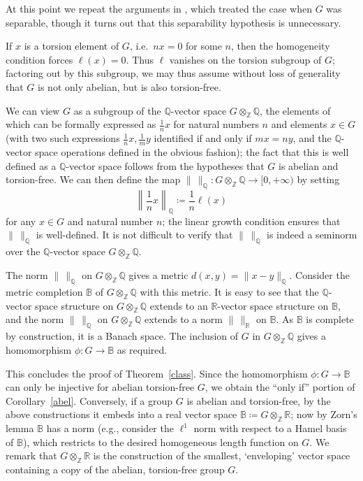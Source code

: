 \documentclass[11pt,a4paper,reqno]{amsart}
\numberwithin{equation}{section}
\theoremstyle{plain}
\theoremstyle{definition}
\newcommand\R{\mathbb{R}}
\newcommand\Z{\mathbb{Z}}
\newcommand\Q{\mathbb{Q}}
\newcommand\normsymb{\ell}  %
\newcommand\norm[1]{\ell({#1})}   %
\begin{document}
At this point we repeat the arguments in \cite[Theorem B]{KR2}, which
treated the case when $G$ was separable, though it turns out that this
separability hypothesis is unnecessary.

If $x$ is a torsion element of $G$, i.e.~$nx=0$ for some $n$, then the
homogeneity condition forces $\norm{x}=0$.  Thus $\normsymb$ vanishes on
the torsion subgroup of $G$; factoring out by this subgroup, we may thus
assume without loss of generality that $G$ is not only abelian, but is
also torsion-free.

We can view $G$ as a subgroup of the $\Q$-vector space $G \otimes_\Z \Q$,
the elements of which can be formally expressed as $\frac{1}{n} x$ for
natural numbers $n$ and elements $x \in G$ (with two such expressions
$\frac{1}{n} x, \frac{1}{m} y$ identified if and only if $mx = ny$, and
the $\Q$-vector space operations defined in the obvious fashion); the
fact that this is well defined as a $\Q$-vector space follows from the
hypotheses that $G$ is abelian and torsion-free.  We can then define
the map $\| \, \|_\Q: G \otimes_\Z \Q \to [0,+\infty)$ by setting
\[
\left\|\frac{1}{n} x\right\|_\Q \coloneqq \frac{1}{n} \norm{x}
\]
for any $x \in G$ and natural number $n$; the linear growth condition
ensures that $\|\,\|_\Q$ is well-defined.  It is not difficult to verify
that $\| \, \|_\Q$ is indeed a seminorm over the $\Q$-vector space $G
\otimes_\Z \Q$.

The norm $\| \, \|_\Q$ on $G \otimes_\Z \Q$ gives a metric $d(x, y) = \|
x-y \|_\Q$. Consider the metric completion $\mathbb{B}$ of $G \otimes_\Z
\Q$ with this metric. It is easy to see that the $\Q$-vector space
structure on $G \otimes_\Z \Q$ extends to an $\R$-vector space structure
on $\mathbb{B}$, and the norm $\|\,\|_\Q$  on $G \otimes_\Z \Q$ extends
to a norm $\|\,\|_\R$  on $\mathbb{B}$. As $\mathbb{B}$ is complete by
construction, it is a Banach space. The inclusion of $G$ in $G \otimes_\Z
\Q$ gives a homomorphism $\phi: G \to \mathbb{B}$ as required.


This concludes the proof of Theorem~\ref{class}.  Since the homomorphism
$\phi: G \to \mathbb{B}$ can only be injective for abelian torsion-free
$G$, we obtain the ``only if'' portion of Corollary~\ref{abel}.
Conversely, if a group $G$ is abelian and torsion-free, by the above
constructions it embeds into a real vector space $\mathbb{B} \coloneqq G
\otimes_\Z \R$; now by Zorn's lemma $\mathbb{B}$ has a norm (e.g.,
consider the $\ell^1$ norm with respect to a Hamel basis of
$\mathbb{B}$), which restricts to the desired homogeneous length function
on $G$.
We remark that $G \otimes_\Z \R$ is the construction of the smallest,
`enveloping' vector space containing a copy of the abelian, torsion-free
group $G$.
\end{document}
